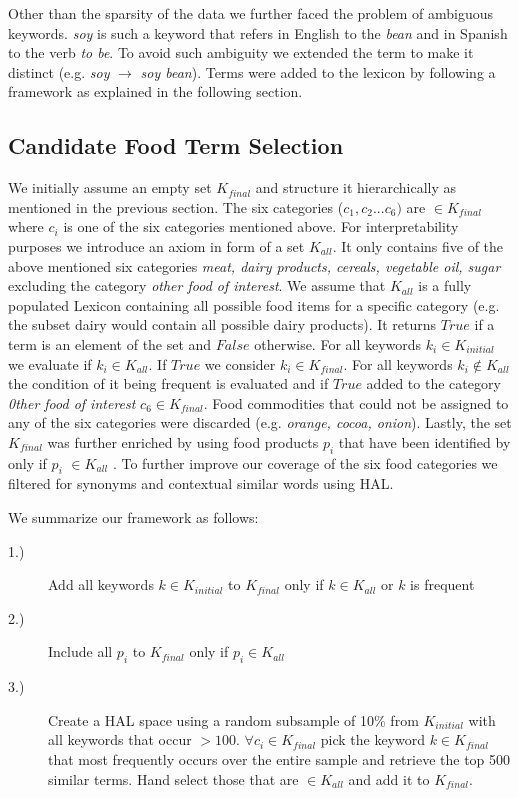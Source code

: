  Other than the sparsity of the data we further faced the problem of ambiguous keywords. \emph {soy} is such a keyword that refers in English to the \emph{bean} and in Spanish to the verb \emph{to be}. To avoid such ambiguity we extended the term to make it distinct (e.g. \emph{soy} $\to$  \emph{soy bean}). Terms were added to the lexicon by following a framework as explained in the following section. 



\subsection{Candidate Food Term Selection}

We initially assume an empty set $K_{final}$ and structure it hierarchically as mentioned in the previous section. The six categories ($c_1, c_2 ... c_6)$ are $\in K_{final}$ where $c_i$ is one of the six categories mentioned above. For interpretability purposes we introduce an axiom in form of a set $K_{all}$. It only contains five of the above mentioned six categories \emph{meat, dairy products, cereals, vegetable oil, sugar} excluding the category \emph{other food of interest}. We assume that $K_{all}$ is a fully populated Lexicon containing all possible food items for a specific category (e.g. the subset dairy would contain all possible dairy products). It returns $True$ if a term is an element of the set and $False$ otherwise. For all keywords $k_i \in K_{initial}$ we evaluate if $k_i\in K_{all}$. If $True$ we consider $k_i \in K_{final}$. For all keywords $k_i \notin K_{all}$ the condition of it being frequent is evaluated and if $True$ added to the category \emph{0ther food of interest}  $c_6 \in K_{final}$.  Food commodities that could not be assigned to any of the six categories were discarded (e.g. \emph {orange, cocoa, onion}). Lastly, the set $K_{final}$  was further enriched by using food products $p_i$ that have been identified by \cite{AbbarMW14}  only if $p_i$ $\in K_{all}$ . To further improve our coverage of the six food categories we filtered for synonyms and contextual similar words using HAL. 

We summarize our framework as follows: 

\begin{description}
  \item[1.)] Add all keywords $k \in K_{initial}$ to  $K_{final}$ only if $k \in K_{all} $ or $k$ is frequent 
  \item[2.)] Include all $p_i$ to $K_{final}$ only if $p_i \in K_{all}$
  \item[3.)] Create a HAL space using a random subsample of 10\% from $K_{initial}$ with all keywords that occur $> 100$. $\forall c_i \in K_{final} $  pick the keyword $k\in K_{final}$ that most frequently occurs over the entire sample and retrieve the top 500 similar terms. Hand select those that are $\in K_{all}$ and add it to $K_{final}$.
\end{description}


